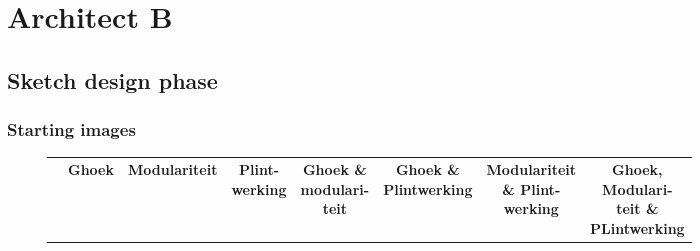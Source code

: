 \section{Architect B} \label{sec:results-B}
\subsection{Sketch design phase}
\subsubsection{Starting images}
\begin{figure}[H]
  \centering
  {\footnotesize
  \renewcommand{\arraystretch}{1.1}
  \setlength{\tabcolsep}{4pt}
  \begin{tabular}{c c c c c c c c}
    & \textbf{Ghoek} & \textbf{Modulariteit} & \shortstack{\textbf{Plint-}\\\textbf{werking}}
    & \shortstack{\textbf{Ghoek \&}\\ \textbf{modulari-}\\\textbf{teit}} 
    & \shortstack{\textbf{Ghoek \&}\\ \textbf{Plintwerking}} 
    & \shortstack{\textbf{Modulariteit} \\ \textbf{ \& Plint-}\\\textbf{werking}} 
    & \shortstack{\textbf{Ghoek,}\\\textbf{Modulari-}\\\textbf{teit \&}\\\textbf{PLintwerking}} \\


\end{tabular}}
\end{figure}
